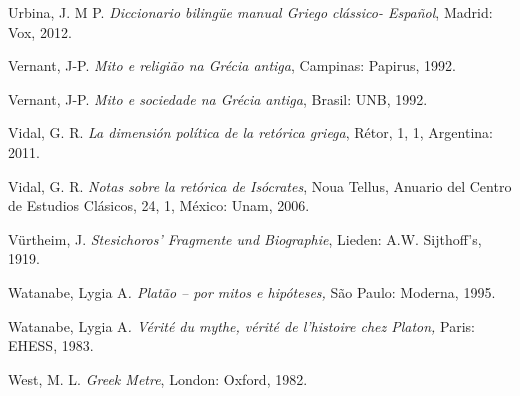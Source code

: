 Urbina, J. M P. \emph{Diccionario bilingüe manual Griego clássico-
Español}, Madrid: Vox, 2012.

Vernant, J-P. \emph{Mito e religião na Grécia antiga}, Campinas:
Papirus, 1992.

Vernant, J-P. \emph{Mito e sociedade na Grécia antiga}, Brasil: UNB,
1992.

Vidal, G. R. \emph{La dimensión política de la retórica griega}, Rétor,
1, 1, Argentina: 2011.

Vidal, G. R. \emph{Notas sobre la retórica de Isócrates}, Noua Tellus,
Anuario del Centro de Estudios Clásicos, 24, 1, México: Unam, 2006.

Vürtheim, J. \emph{Stesichoros' Fragmente und Biographie}, Lieden: A.W.
Sijthoff's, 1919.

Watanabe, Lygia A\emph{. Platão -- por mitos e hipóteses,} São Paulo:
Moderna, 1995.

Watanabe, Lygia A\emph{. Vérité du mythe, vérité de l'histoire chez
Platon,} Paris: EHESS, 1983.

West, M. L. \emph{Greek Metre}, London: Oxford, 1982.
